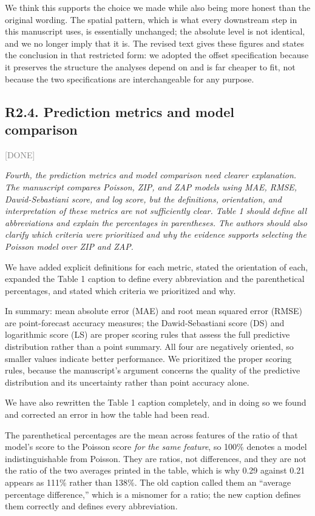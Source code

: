\documentclass[11pt]{article}
\newcommand{\status}[1]{\textcolor{gray}{\small\textsf{[#1]}}}
\newenvironment{rev}{\begin{leftbar}\itshape\small}{\end{leftbar}}
\begin{document}
We think this supports the choice we made while also being more honest than the original
wording. The spatial pattern, which is what every downstream step in this manuscript uses, is
essentially unchanged; the absolute level is not identical, and we no longer imply that it is.
The revised text gives these figures and states the conclusion in that restricted form: we
adopted the offset specification because it preserves the structure the analyses depend on and
is far cheaper to fit, not because the two specifications are interchangeable for any purpose.

\subsection{R2.4. Prediction metrics and model comparison} \status{DONE}

\begin{rev}
Fourth, the prediction metrics and model comparison need clearer explanation. The
manuscript compares Poisson, ZIP, and ZAP models using MAE, RMSE, Dawid-Sebastiani score,
and log score, but the definitions, orientation, and interpretation of these metrics are
not sufficiently clear. Table 1 should define all abbreviations and explain the
percentages in parentheses. The authors should also clarify which criteria were
prioritized and why the evidence supports selecting the Poisson model over ZIP and ZAP.
\end{rev}

\noindent We have added explicit definitions for each metric, stated the orientation of
each, expanded the Table 1 caption to define every abbreviation and the parenthetical
percentages, and stated which criteria we prioritized and why.

In summary: mean absolute error (MAE) and root mean squared error (RMSE) are point-forecast
accuracy measures; the Dawid-Sebastiani score (DS) and logarithmic score (LS) are proper
scoring rules that assess the full predictive distribution rather than a point summary. All
four are negatively oriented, so smaller values indicate better performance. We prioritized
the proper scoring rules, because the manuscript's argument concerns the quality of the
predictive distribution and its uncertainty rather than point accuracy alone.

We have also rewritten the Table 1 caption completely, and in doing so we found and
corrected an error in how the table had been read.

The parenthetical percentages are the mean across features of the ratio of that model's
score to the Poisson score \emph{for the same feature}, so 100\% denotes a model
indistinguishable from Poisson. They are ratios, not differences, and they are not the
ratio of the two averages printed in the table, which is why 0.29 against 0.21 appears as
111\% rather than 138\%. The old caption called them an ``average percentage difference,''
which is a misnomer for a ratio; the new caption defines them correctly and defines every
abbreviation.
\end{document}
